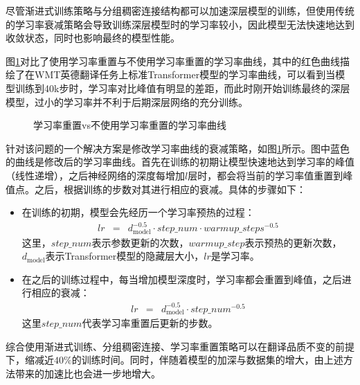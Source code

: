 \parinterval 尽管渐进式训练策略与分组稠密连接结构都可以加速深层模型的训练，但使用传统的学习率衰减策略会导致训练深层模型时的学习率较小，因此模型无法快速地达到收敛状态，同时也影响最终的模型性能。

\parinterval  图\ref{fig:15-17}对比了使用学习率重置与不使用学习率重置的学习率曲线，其中的红色曲线描绘了在WMT英德翻译任务上标准Transformer模型的学习率曲线，可以看到当模型训练到40k步时，学习率对比峰值有明显的差距，而此时刚开始训练最终的深层模型，过小的学习率并不利于后期深层网络的充分训练。

\begin{figure}[htp]
\centering

\caption{学习率重置vs不使用学习率重置的学习率曲线}
\label{fig:15-17}
\end{figure}

\parinterval 针对该问题的一个解决方案是修改学习率曲线的衰减策略，如图\ref{fig:15-17}所示。图中蓝色的曲线是修改后的学习率曲线。首先在训练的初期让模型快速地达到学习率的峰值（线性递增），之后神经网络的深度每增加$l$层时，都会将当前的学习率值重置到峰值点。之后，根据训练的步数对其进行相应的衰减。具体的步骤如下：

\begin{itemize}
\vspace{0.5em}
\item 在训练的初期，模型会先经历一个学习率预热的过程：
\begin{eqnarray}
lr &=& d_{\textrm{model}}^{-0.5}\cdot step\_num \cdot warmup\_steps^{-0.5}
\label{eq:15-49}
\end{eqnarray}
\noindent 这里，$step\_num$表示参数更新的次数，$warmup\_step$表示预热的更新次数，$d_{\textrm{model}}$表示Transformer模型的隐藏层大小，$lr$是学习率。
\vspace{0.5em}
\item 	在之后的训练过程中，每当增加模型深度时，学习率都会重置到峰值，之后进行相应的衰减：
\begin{eqnarray}
lr &=& d_{\textrm{model}}^{-0.5}\cdot step\_num^{-0.5}
\label{eq:15-50}
\end{eqnarray}
\noindent 这里$step\_num$代表学习率重置后更新的步数。
\vspace{0.5em}
\end{itemize}

\parinterval 综合使用渐进式训练、分组稠密连接、学习率重置策略可以在翻译品质不变的前提下，缩减近$40\%$的训练时间。同时，伴随着模型的加深与数据集的增大，由上述方法带来的加速比也会进一步地增大。

